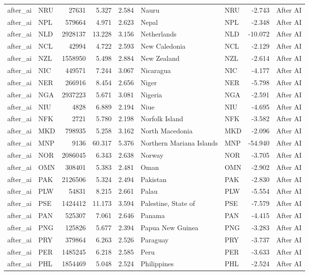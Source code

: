 \begin{tabular}{llrrrllrl}
after\_ai & NRU & 27631 & 5.327 & 2.584 & Nauru & NRU & -2.743 & After AI \\
after\_ai & NPL & 579664 & 4.971 & 2.623 & Nepal & NPL & -2.348 & After AI \\
after\_ai & NLD & 2928137 & 13.228 & 3.156 & Netherlands & NLD & -10.072 & After AI \\
after\_ai & NCL & 42994 & 4.722 & 2.593 & New Caledonia & NCL & -2.129 & After AI \\
after\_ai & NZL & 1558950 & 5.498 & 2.884 & New Zealand & NZL & -2.614 & After AI \\
after\_ai & NIC & 449571 & 7.244 & 3.067 & Nicaragua & NIC & -4.177 & After AI \\
after\_ai & NER & 266916 & 8.454 & 2.656 & Niger & NER & -5.798 & After AI \\
after\_ai & NGA & 2937223 & 5.671 & 3.081 & Nigeria & NGA & -2.591 & After AI \\
after\_ai & NIU & 4828 & 6.889 & 2.194 & Niue & NIU & -4.695 & After AI \\
after\_ai & NFK & 2721 & 5.780 & 2.198 & Norfolk Island & NFK & -3.582 & After AI \\
after\_ai & MKD & 798935 & 5.258 & 3.162 & North Macedonia & MKD & -2.096 & After AI \\
after\_ai & MNP & 9136 & 60.317 & 5.376 & Northern Mariana Islands & MNP & -54.940 & After AI \\
after\_ai & NOR & 2086045 & 6.343 & 2.638 & Norway & NOR & -3.705 & After AI \\
after\_ai & OMN & 308401 & 5.383 & 2.481 & Oman & OMN & -2.902 & After AI \\
after\_ai & PAK & 2126506 & 5.324 & 2.494 & Pakistan & PAK & -2.830 & After AI \\
after\_ai & PLW & 54831 & 8.215 & 2.661 & Palau & PLW & -5.554 & After AI \\
after\_ai & PSE & 1424412 & 11.173 & 3.594 & Palestine, State of & PSE & -7.579 & After AI \\
after\_ai & PAN & 525307 & 7.061 & 2.646 & Panama & PAN & -4.415 & After AI \\
after\_ai & PNG & 125826 & 5.677 & 2.394 & Papua New Guinea & PNG & -3.283 & After AI \\
after\_ai & PRY & 379864 & 6.263 & 2.526 & Paraguay & PRY & -3.737 & After AI \\
after\_ai & PER & 1485245 & 6.218 & 2.585 & Peru & PER & -3.633 & After AI \\
after\_ai & PHL & 1854469 & 5.048 & 2.524 & Philippines & PHL & -2.524 & After AI \\

\end{tabular}
